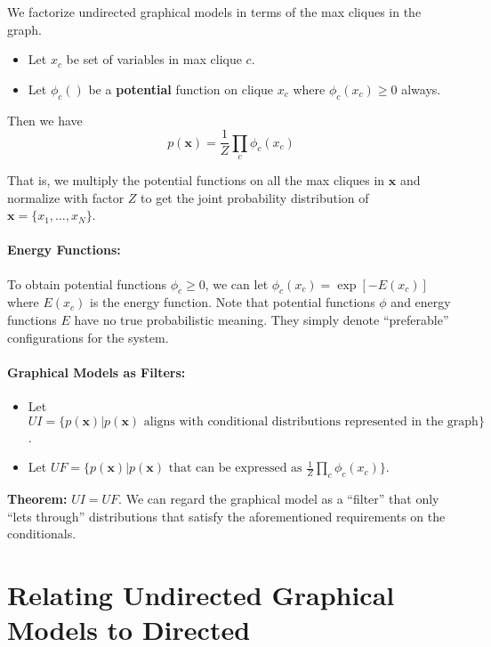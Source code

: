 \documentclass[a4paper,12pt]{report}
\begin{document}
We factorize undirected graphical models in terms of the max cliques in the graph.

\begin{itemize}
\item Let $x_c$ be set of variables in max clique $c$.
\item Let $\phi_c()$ be a \textbf{potential} function on clique $x_c$ where $\phi_c(x_c) \geq 0$ always.
\end{itemize}
Then we have
\begin{equation}
p(\pmb x) = \frac{1}{Z} \prod_c \phi_c(x_c)
\end{equation}

That is, we multiply the potential functions on all the max cliques in $\pmb x$ and normalize with factor $Z$ to get the joint probability distribution of $\pmb x = \{x_1, \dots, x_N\}$.

\paragraph{Energy Functions: } To obtain potential functions $\phi_c \geq 0$, we can let $\phi_c(x_c) = \exp[-E(x_c)]$ where $E(x_c)$ is the energy function. Note that potential functions $\phi$ and energy functions $E$ have no true probabilistic meaning. They simply denote ``preferable'' configurations for the system. 

\paragraph{Graphical Models as Filters: } 
\begin{itemize}
\item Let $UI = \{p(\pmb x) | p(\pmb x) \text{ aligns with conditional distributions represented in the graph}\}$.
\item Let $UF = \{p(\pmb x) | p(\pmb x) \text{ that can be expressed as } \frac{1}{Z} \prod_c \phi_c(x_c)\}$.
\end{itemize}

\textbf{Theorem: } $UI = UF$. We can regard the graphical model as a ``filter'' that only ``lets through'' distributions that satisfy the aforementioned requirements on the conditionals.

\section{Relating Undirected Graphical Models to Directed}
\end{document}
